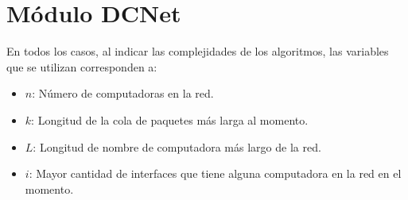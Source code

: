 \section{M\'{o}dulo DCNet}

  En todos los casos, al indicar las complejidades de los algoritmos, las variables que se utilizan corresponden a:
  \vspace{-0.5em}\begin{itemize}
    \item $n$: N\'umero de computadoras en la red.
    \item $k$: Longitud de la cola de paquetes m\'as larga al momento.
    \item $L$: Longitud de nombre de computadora m\'as largo de la red.
    \item $i$: Mayor cantidad de interfaces que tiene alguna computadora en la red en el momento.
  \end{itemize}

